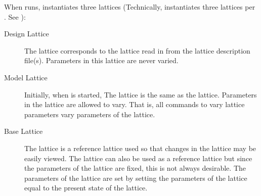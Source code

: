 \documentclass{hitec}     %
\begin{document}
When \tao runs, \tao instantiates three lattices
(Technically, \tao instantiates three lattices per . See ):
\begin{description}
\item[Design Lattice] \Newline
The  lattice corresponds to the lattice read in from the lattice
description file(s). Parameters in this lattice are never varied.
\item[Model Lattice] \Newline
Initially, when \tao is started, The  lattice is the same as the 
lattice. Parameters in the  lattice are allowed to vary. That is, all commands to vary
lattice parameters vary parameters of the  lattice.
\item[Base Lattice] \Newline
The  lattice is a reference lattice used so that changes in the  lattice may be
easily viewed. The  lattice can also be used as a reference lattice but since the
parameters of the  lattice are fixed, this is not always desirable. The parameters of the
 lattice are set by setting the parameters of the  lattice equal to the present
state of the  lattice.
\end{description}
\end{document}
